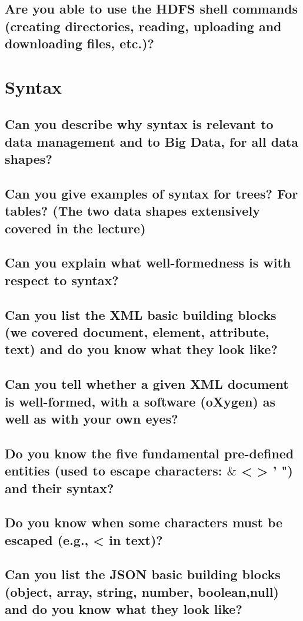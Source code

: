 \documentclass{article}
\begin{document}
\subsection{Are you able to use the HDFS shell commands (creating directories, reading, uploading and downloading files, etc.)?}

\pagebreak

\section{Syntax}
\subsection{Can you describe why syntax is relevant to data management and to Big Data, for all data shapes?}
\subsection{Can you give examples of syntax for trees? For tables? (The two data shapes extensively covered in the lecture)}
\subsection{Can you explain what well-formedness is with respect to syntax?}
\subsection{Can you list the XML basic building blocks (we covered document, element, attribute, text) and do you know what they look like?}
\subsection{Can you tell whether a given XML document is well-formed, with a software (oXygen) as well as with your own eyes?}
\subsection{Do you know the five fundamental pre-defined entities (used to escape characters: $\&$ < > ' ") and their syntax?}
\subsection{Do you know when some characters must be escaped (e.g., < in text)?}
\subsection{Can you list the JSON basic building blocks (object, array, string, number, boolean,null) and do you know what they look like?}
\end{document}
